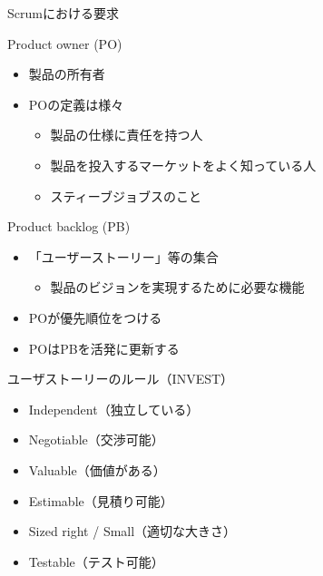 \documentclass[t]{beamer}
\begin{document}
\begin{frame}[label=sec-2-2]{Scrumにおける要求}
\begin{block}{Product owner (PO)}
\begin{itemize}
\item 製品の所有者
\item POの定義は様々
\begin{itemize}
\item 製品の仕様に責任を持つ人
\item 製品を投入するマーケットをよく知っている人
\item スティーブジョブスのこと
\end{itemize}
\end{itemize}
\end{block}
\begin{block}{Product backlog (PB)}
\begin{itemize}
\item 「ユーザーストーリー」等の集合
\begin{itemize}
\item 製品のビジョンを実現するために必要な機能
\end{itemize}
\item POが優先順位をつける
\item POはPBを活発に更新する
\end{itemize}
\end{block}
\end{frame}

\begin{frame}[label=sec-2-3]{ユーザストーリーのルール（INVEST）}
\begin{itemize}
\item Independent（独立している）
\item Negotiable（交渉可能）
\item Valuable（価値がある）
\item Estimable（見積り可能）
\item Sized right / Small（適切な大きさ）
\item Testable（テスト可能）
\end{itemize}
\end{frame}
\end{document}
